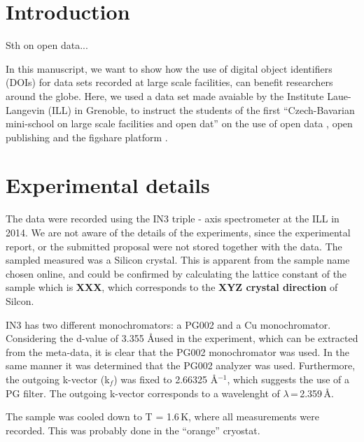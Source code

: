 \documentclass[aps,prx,reprint,amsmath,amssymb,superscriptaddress,showpacs]{revtex4-1}
\begin{document}
\maketitle



\section{Introduction}

Sth on open data...

In this manuscript, we want to show how the use of digital object identifiers (DOIs) for data sets recorded at large scale facilities, can benefit researchers around the globe. 
Here, we used a data \cite{data} set made avaiable by the Institute Laue-Langevin (ILL) in Grenoble, to instruct the students of the first ``Czech-Bavarian mini-school on large scale facilities and open dat'' \cite{mini-school} on the use of open data \cite{foster}, open publishing \cite{arXiv} and the figshare platform \cite{figshare}. 

\section{Experimental details}

The data were recorded using the IN3 triple - axis spectrometer \cite{IN3} at the ILL in 2014.
We are not aware of the details of the experiments, since the experimental report, or the submitted proposal were not stored together with the data.
The sampled measured was a Silicon crystal. 
This is apparent from the sample name chosen online, and could be confirmed by calculating the lattice constant of the sample which is \textbf{XXX}, which corresponds to the \textbf{XYZ crystal direction} of Silcon.

IN3 has two different monochromators: a PG002 and a Cu monochromator.
Considering the d-value of 3.355 \AA used in the experiment, which can be extracted from the meta-data, it is clear that the PG002 monochromator was used.
In the same manner it was determined that the PG002 analyzer was used. 
Furthermore, the outgoing k-vector (k$_f$) was fixed to 2.66325 \AA$^{-1}$, which suggests the use of a PG filter. 
The outgoing k-vector corresponds to a wavelenght of $\lambda$\,=\,2.359\,\AA.

The sample was cooled down to T = 1.6\,K, where all measurements were recorded. 
This was probably done in the ``orange'' cryostat.
\end{document}
